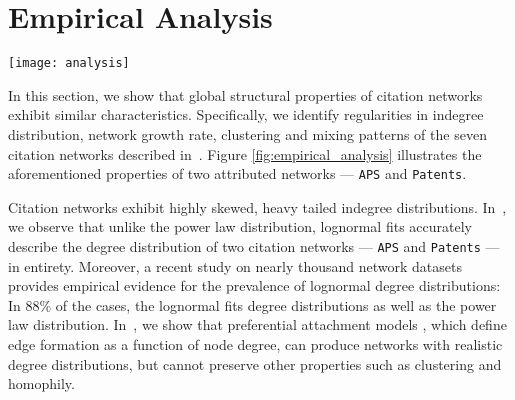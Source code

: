 

\section{Empirical Analysis}
\label{sec:Empirical Analysis}
\begin{figure*}[!t]
 \centering
 \texttt{[image: analysis]}
 \caption{
 Structural and content properties of \texttt{APS} and \texttt{Patents}.
 The subplots show that citation networks exhibit similar characteristics:
 heavy-tailed indegree distribution, skewed
 local clustering distribution, decreasing indegree \&
 clustering relationship, increasing average outdegree over time and assortative mixing.
 Furthermore, the subplots illustrate that indegree distributions are lognormally distributed
 and networks generated by the null (configuration) model do not exhibit the local clustering
 observed in citation networks.
}
 \label{fig:empirical_analysis}
 \vspace{-4mm}
\end{figure*}

In this section, we show that global structural properties of citation networks
exhibit similar characteristics. Specifically, we identify
regularities in indegree distribution, network growth rate, clustering and
mixing patterns of the seven citation networks described in~.
Figure \ref{fig:empirical_analysis} illustrates the aforementioned properties of two
attributed networks --- \texttt{APS} and \texttt{Patents}.


Citation networks exhibit highly skewed, heavy tailed indegree distributions.
In~, we observe that unlike the power law
distribution, lognormal fits accurately describe the degree distribution of two
citation networks --- \texttt{APS} and \texttt{Patents} --- in entirety.
Moreover, a recent study \cite{broido2018scale} on nearly thousand network
datasets provides empirical evidence for the prevalence of lognormal degree
distributions: In 88\% of the cases, the lognormal fits degree distributions as
well as the power law distribution. In~, we show that
preferential attachment models
\cite{dorogovtsev2000structure,barabasi1999emergence}, which define edge
formation as a function of node degree, can produce networks with realistic
degree distributions, but cannot preserve other properties such as clustering
and homophily.

